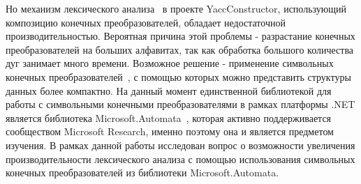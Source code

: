 Но механизм лексического анализа~\cite{polubelova} в проекте YaccConstructor, использующий композицию конечных преобразователей, обладает недостаточной производительностью. Вероятная причина этой проблемы - разрастание конечных преобразователей на больших алфавитах, так как обработка большого количества дуг занимает много времени. Возможное решение - применение символьных конечных преобразователей~\cite{st}, с помощью которых можно представить структуры данных более компактно. 
На данный момент единственной библиотекой для работы с символьными конечными преобразователями в рамках платформы .NET является библиотека Microsoft.Automata~\cite{MSAUrl}, которая активно поддерживается сообществом Microsoft Research, именно поэтому она и является предметом изучения.
В рамках данной работы исследован вопрос о возможности увеличения производительности лексического анализа с помощью использования символьных конечных преобразователей из библиотеки Microsoft.Automata.
